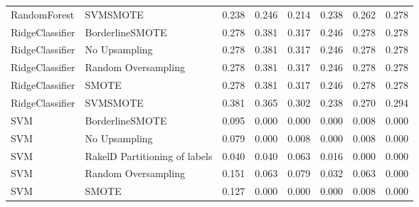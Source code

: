 \begin{tabular}{llllllll}
                   RandomForest &                      SVMSMOTE & 0.238 &                     0.246 &                 0.214 &                  0.238 &                                   0.262 &     0.278 \\
                RidgeClassifier &               BorderlineSMOTE & 0.278 &                     0.381 &                 0.317 &                  0.246 &                                   0.278 &     0.278 \\
                RidgeClassifier &                 No Upsampling & 0.278 &                     0.381 &                 0.317 &                  0.246 &                                   0.278 &     0.278 \\
                RidgeClassifier &           Random Oversampling & 0.278 &                     0.381 &                 0.317 &                  0.246 &                                   0.278 &     0.278 \\
                RidgeClassifier &                         SMOTE & 0.278 &                     0.381 &                 0.317 &                  0.246 &                                   0.278 &     0.278 \\
                RidgeClassifier &                      SVMSMOTE & 0.381 &                     0.365 &                 0.302 &                  0.238 &                                   0.270 &     0.294 \\
                            SVM &               BorderlineSMOTE & 0.095 &                     0.000 &                 0.000 &                  0.000 &                                   0.008 &     0.000 \\
                            SVM &                 No Upsampling & 0.079 &                     0.000 &                 0.008 &                  0.000 &                                   0.008 &     0.000 \\
                            SVM & RakelD Partitioning of labels & 0.040 &                     0.040 &                 0.063 &                  0.016 &                                   0.000 &     0.000 \\
                            SVM &           Random Oversampling & 0.151 &                     0.063 &                 0.079 &                  0.032 &                                   0.063 &     0.000 \\
                            SVM &                         SMOTE & 0.127 &                     0.000 &                 0.000 &                  0.000 &                                   0.008 &     0.000 \\

\end{tabular}
